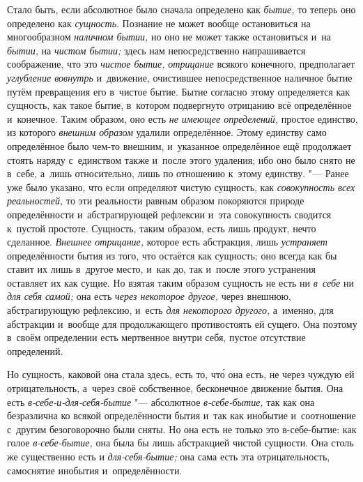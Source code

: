 Стало быть, если абсолютное было сначала определено как
{\em бытие,} то теперь оно определено как
{\em сущность}. Познание не может вообще остановиться
на многообразном {\em наличном бытии,} но оно не может
также остановиться и~на {\em бытии,} на
{\em чистом бытии;} здесь нам непосредственно
напрашивается соображение, что это {\em чистое бытие,}
{\em отрицание} всякого конечного, предполагает
{\em углубление вовнутрь} и~движение, очистившее
непосредственное наличное бытие путём превращения его в~чистое бытие. Бытие
согласно этому определяется как сущность, как такое бытие, в~котором
подвергнуто отрицанию всё определённое и~конечное. Таким образом, оно есть
{\em не имеющее определений,} простое единство, из
которого {\em внешним образом} удалили определённое.
Этому единству само определённое было чем-то внешним, и~указанное
определённое ещё продолжает стоять наряду с~единством также и~после этого
удаления; ибо оно было снято не в~себе, а~лишь относительно, лишь по
отношению к~этому единству. "--- Ранее
уже было указано, что если определяют чистую сущность, как
{\em совокупность всех реальностей,} то эти реальности
равным образом покоряются природе определённости и~абстрагирующей рефлексии
и~эта совокупность сводится к~пустой простоте. Сущность, таким образом,
есть лишь продукт, нечто сделанное. {\em Внешнее
отрицание,} которое есть абстракция, лишь
{\em устраняет} определённости бытия из того, что
остаётся как сущность; оно
всегда как бы ставит их лишь в~другое место, и~как до, так и~после этого
устранения оставляет их как сущие. Но взятая таким образом сущность не есть
ни {\em в~себе} ни {\em для себя самой;} она есть {\em через некоторое другое,}
через внешнюю, абстрагирующую рефлексию, и~есть {\em для
некоторого другого,} а~именно, для абстракции и~вообще для продолжающего
противостоять ей сущего. Она поэтому в~своём определении есть мертвенное
внутри себя, пустое отсутствие определений.

Но сущность, каковой она стала здесь, есть то, чт\'{о} она есть, не через чуждую
ей отрицательность, а~через своё собственное, бесконечное движение бытия.
Она есть {\em в-себе-и-для-себя-бытие} "--- абсолютное
{\em в-себе-бытие,} так как она безразлична ко всякой
определённости бытия и~так как инобытие и~соотношение с~другим
безоговорочно были сняты. Но она есть не только это в-себе-бытие: как голое
{\em в-себе-бытие,} она была бы лишь абстракцией чистой
сущности. Она столь же существенно есть и
{\em для-себя-бытие;} она сама есть эта
отрицательность, самоснятие инобытия и~определённости.

